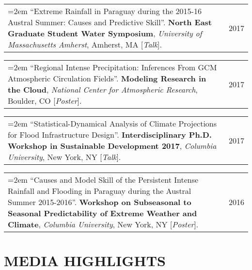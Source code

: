 \documentclass[10pt,oneside]{article}
\makeatletter
\newenvironment{alignedentrieshang}[1][2em]{%
  \noindent%
}{%
}
\newcommand{\hangingitem}[2]{%
  \noindent%
  \begin{tabular*}{\textwidth}{@{}p{0.85\textwidth}@{\extracolsep{\fill}}r@{}}%
    \hangindent=2em \hangafter=1 #1 & #2%
  \end{tabular*}%
}
\makeatother
\begin{document}
\begin{alignedentrieshang}
\hangingitem{\enquote{Extreme Rainfall in Paraguay during the 2015-16 Austral Summer: Causes and Predictive Skill}. \textbf{North East Graduate Student Water Symposium}, \textit{University of Massachusetts Amherst}, Amherst, MA [\textit{Talk}].}{2017}



\hangingitem{\enquote{Regional Intense Precipitation: Inferences From GCM Atmospheric Circulation Fields}. \textbf{Modeling Research in the Cloud}, \textit{National Center for Atmospheric Research}, Boulder, CO [\textit{Poster}].}{2017}



\hangingitem{\enquote{Statistical-Dynamical Analysis of Climate Projections for Flood Infrastructure Design}. \textbf{Interdisciplinary Ph.D. Workshop in Sustainable Development 2017}, \textit{Columbia University}, New York, NY [\textit{Talk}].}{2017}



\hangingitem{\enquote{Causes and Model Skill of the Persistent Intense Rainfall and Flooding in Paraguay during the Austral Summer 2015-2016}. \textbf{Workshop on Subseasonal to Seasonal Predictability of Extreme Weather and Climate}, \textit{Columbia University}, New York, NY [\textit{Poster}].}{2016}


\end{alignedentrieshang}

\section{MEDIA HIGHLIGHTS}
\end{document}
